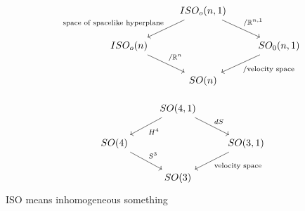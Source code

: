 \begin{equation*}
    \begin{tikzcd}
        &ISO_o(n,1) \arrow["\textrm{space of spacelike hyperplane}", swap]{dl} \arrow["/\mathbb{R}^{n,1}"]{dr}&\\
        ISO_o(n) \arrow["/\mathbb{R}^n"]{dr}&&SO_0(n,1) \arrow["\textrm{/velocity space}"]{dl} \\
        &SO(n)&
    \end{tikzcd}
\end{equation*}

\begin{equation*}
    \begin{tikzcd}
        &SO(4,1) \arrow["dS"]{dr} \arrow["H^4"]{dl}&\\
        SO(4) \arrow["S^3"]{dr}&&SO(3,1) \arrow["\textrm{velocity space}"]{dl}\\
        &SO(3)&
    \end{tikzcd}
\end{equation*}
ISO means inhomogeneous something
